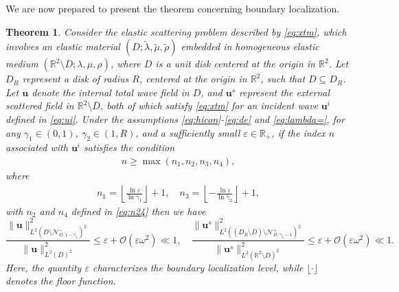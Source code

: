 \documentclass[11pt,reqno,twoside]{amsart}
\newtheorem{thm}{Theorem}[section]
\theoremstyle{definition}
\theoremstyle{remark}
\numberwithin{equation}{section}
\newcommand{\bu}{\mathbf{u}}
\begin{document}
We are now prepared to present the theorem concerning boundary localization.
\begin{thm}\label{thm:isl}
	Consider the elastic scattering problem described by \eqref{eq:xtm}, which involves an elastic material \(\left(D;\tilde{\lambda},\tilde{\mu},\tilde{\rho}\right)\) embedded in  homogeneous elastic medium \(\left(\mathbb{R}^2 \setminus \overline{D};\lambda,\mu,\rho\right)\), where \(D\) is a unit disk centered at the origin in \(\mathbb{R}^2\). Let \(D_R\) represent a disk of radius \(R\), centered at the origin in \(\mathbb{R}^2\), such that \(D \subseteq D_R\).  Let \(\bu\) denote the internal total wave field in \(D\), and  \(\bu^s\) represent the external scattered field in \(\mathbb{R}^2 \setminus \overline{D}\), both of which satisfy \eqref{eq:xtm} for an incident wave \(\bu^i\) defined in \eqref{eq:ui}. Under the assumptions \eqref{eq:hicon}-\eqref{eq:de} and \eqref{eq:lambda=}, for any \(\gamma_1 \in (0, 1)\), \(\gamma_2 \in (1, R)\), and a sufficiently small \(\varepsilon \in \mathbb{R}_+\), if the index \(n\) associated with \(\bu^i\) satisfies the condition 
	\begin{align}\label{eq:condition}
		n \geq \max(n_1, n_2, n_3, n_4),
	\end{align} where
	\begin{align}\label{eq:n13}
		n_1 = \left\lfloor\frac{\ln\varepsilon}{\ln\gamma_1}\right\rfloor + 1, \quad n_3 = \left\lfloor-\frac{\ln\varepsilon}{\ln\gamma_2}\right\rfloor + 1,
	\end{align}
	with $n_2$ and $n_4$ defined in \eqref{eq:n24}
	then we have
	$$
	\frac{\|\mathbf{u}\|_{L^2(D \setminus \mathcal{N}_{D,1-\gamma_{1}}^{-})^2}^2}{\|\mathbf{u}\|_{L^2(D)^2}^2} \leq \varepsilon + \mathcal{O}\left(\varepsilon\omega^2\right) \ll 1, \quad \frac{\|\mathbf{u}^s\|_{L^2(\left(D_R \setminus \overline{D}\right) \setminus \mathcal{N}_{D,\gamma_{2}-1}^{+})^2}^2}{\|\mathbf{u}^s\|_{L^2(\mathbb{R}^2 \setminus D)^2}^2} \leq \varepsilon + \mathcal{O}\left(\varepsilon\omega^2\right)  { \ll }  1.
	$$
	Here, the quantity \(\varepsilon\) characterizes the boundary localization level, while \(\lfloor \cdot \rfloor\) denotes the floor function. 
\end{thm}
\end{document}

